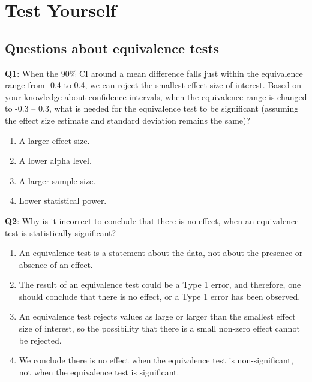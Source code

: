 \documentclass[
  oneside]{book}
\providecommand{\tightlist}{%
  \setlength{\itemsep}{0pt}\setlength{\parskip}{0pt}}
\begin{document}
\hypertarget{test-yourself-7}{%
\section{Test Yourself}\label{test-yourself-7}}

\hypertarget{questions-about-equivalence-tests}{%
\subsection{Questions about equivalence tests}\label{questions-about-equivalence-tests}}

\textbf{Q1}: When the 90\% CI around a mean difference falls just within the equivalence range from -0.4 to 0.4, we can reject the smallest effect size of interest. Based on your knowledge about confidence intervals, when the equivalence range is changed to -0.3 -- 0.3, what is needed for the equivalence test to be significant (assuming the effect size estimate and standard deviation remains the same)?

\begin{enumerate}
\def\labelenumi{\Alph{enumi})}
\tightlist
\item
  A larger effect size.
\item
  A lower alpha level.
\item
  A larger sample size.
\item
  Lower statistical power.
\end{enumerate}

\textbf{Q2}: Why is it incorrect to conclude that there is no effect, when an equivalence test is statistically significant?

\begin{enumerate}
\def\labelenumi{\Alph{enumi})}
\tightlist
\item
  An equivalence test is a statement about the data, not about the presence or absence of an effect.
\item
  The result of an equivalence test could be a Type 1 error, and therefore, one should conclude that there is no effect, or a Type 1 error has been observed.\\
\item
  An equivalence test rejects values as large or larger than the smallest effect size of interest, so the possibility that there is a small non-zero effect cannot be rejected.\\
\item
  We conclude there is no effect when the equivalence test is non-significant, not when the equivalence test is significant.
\end{enumerate}
\end{document}
